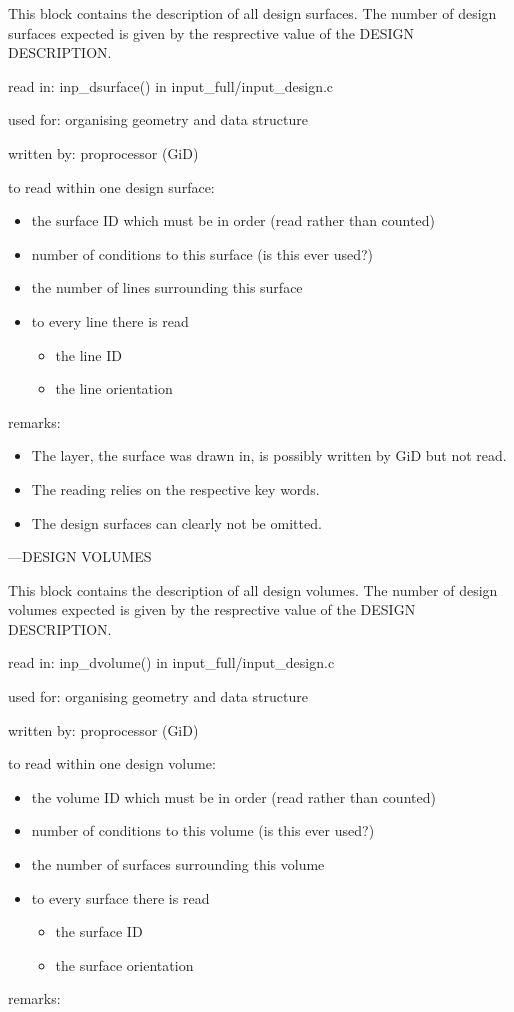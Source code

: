 This block contains the description of all design surfaces. The number
of design surfaces expected is given by the resprective value of the
DESIGN DESCRIPTION. 

read in: inp\_dsurface() in input\_full/input\_design.c 

used for: organising geometry and data structure 

written by: proprocessor (GiD) 

to read within one design surface: 

\begin{itemize}
\item the surface ID which must be in order (read rather than counted) 
\item number of conditions to this surface (is this ever used?) 
\item the number of lines surrounding this surface 
\item to every line there is read 

\begin{itemize}
\item the line ID 
\item the line orientation 
\end{itemize}
\end{itemize}
remarks: 

\begin{itemize}
\item The layer, the surface was drawn in, is possibly written by GiD but
not read. 
\item The reading relies on the respective key words. 
\item The design surfaces can clearly not be omitted.
\end{itemize}
---DESIGN VOLUMES 

This block contains the description of all design volumes. The number
of design volumes expected is given by the resprective value of the
DESIGN DESCRIPTION. 

read in: inp\_dvolume() in input\_full/input\_design.c 

used for: organising geometry and data structure 

written by: proprocessor (GiD) 

to read within one design volume: 

\begin{itemize}
\item the volume ID which must be in order (read rather than counted) 
\item number of conditions to this volume (is this ever used?) 
\item the number of surfaces surrounding this volume 
\item to every surface there is read 

\begin{itemize}
\item the surface ID 
\item the surface orientation 
\end{itemize}
\end{itemize}
remarks: 

